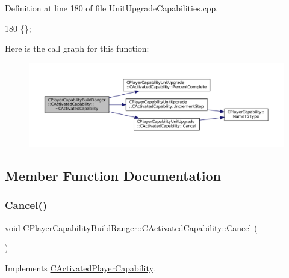 Definition at line 180 of file Unit\+Upgrade\+Capabilities.\+cpp.


\begin{DoxyCode}
180 \{\};
\end{DoxyCode}
Here is the call graph for this function\+:
\nopagebreak
\begin{figure}[H]
\begin{center}
\leavevmode
\includegraphics[width=350pt]{classCPlayerCapabilityBuildRanger_1_1CActivatedCapability_afd5d1ba5ad2b35faa67e4574627d46e1_cgraph}
\end{center}
\end{figure}


\subsection{Member Function Documentation}
\hypertarget{classCPlayerCapabilityBuildRanger_1_1CActivatedCapability_a46a5240502d6a8de65d3d56bbda8bf91}{}\label{classCPlayerCapabilityBuildRanger_1_1CActivatedCapability_a46a5240502d6a8de65d3d56bbda8bf91} 
\subsubsection{\texorpdfstring{Cancel()}{Cancel()}}
{\footnotesize\ttfamily void C\+Player\+Capability\+Build\+Ranger\+::\+C\+Activated\+Capability\+::\+Cancel (\begin{DoxyParamCaption}{ }\end{DoxyParamCaption})\hspace{0.3cm}{\ttfamily [virtual]}}



Implements \hyperlink{classCActivatedPlayerCapability_a5cde83be468e262ad054d81e28684a81}{C\+Activated\+Player\+Capability}.



